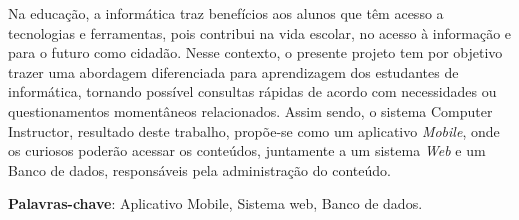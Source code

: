 %
%

\begin{RESUMO}
	\begin{SingleSpace}
		
		\hspace{-1.5cm}
		Na educação, a informática traz benefícios aos alunos que têm acesso a tecnologias e ferramentas, pois contribui na vida escolar, no acesso à informação e para o futuro como cidadão. Nesse contexto, o presente projeto tem por objetivo trazer uma abordagem diferenciada para aprendizagem dos estudantes de informática, tornando possível consultas rápidas de acordo com necessidades ou questionamentos momentâneos relacionados. Assim sendo, o sistema Computer Instructor, resultado deste trabalho, propõe-se como um aplicativo \textit{Mobile}, onde os curiosos poderão acessar os conteúdos, juntamente a um sistema \textit{Web} e um Banco de dados, responsáveis pela administração do conteúdo.
		
		\vspace*{0.5cm}\hspace{-1.5 cm}\textbf{Palavras-chave}: Aplicativo Mobile, Sistema web, Banco de dados.
				
	\end{SingleSpace}
\end{RESUMO}


